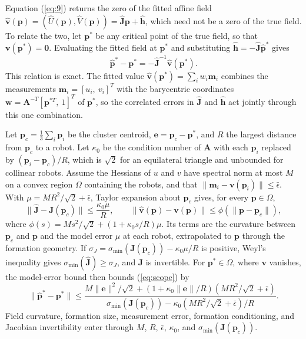 \documentclass[lettersize,journal]{IEEEtran}
\begin{document}
Equation (\ref{eq:9}) returns the zero of the fitted affine field $\hat{\mathbf{v}}(\mathbf{p}) = (\hat{U}(\mathbf{p}), \hat{V}(\mathbf{p})) = \hat{\mathbf{J}}\mathbf{p} + \hat{\mathbf{h}}$, which need not be a zero of the true field. To relate the two, let $\mathbf{p}^*$ be any critical point of the true field, so that $\mathbf{v}(\mathbf{p}^*) = \mathbf{0}$. Evaluating the fitted field at $\mathbf{p}^*$ and substituting $\hat{\mathbf{h}} = -\hat{\mathbf{J}}\hat{\mathbf{p}}^*$ gives
\begin{equation}\label{eq:scope}
\hat{\mathbf{p}}^* - \mathbf{p}^* = -\hat{\mathbf{J}}^{-1}\hat{\mathbf{v}}(\mathbf{p}^*).
\end{equation}
This relation is exact. The fitted value $\hat{\mathbf{v}}(\mathbf{p}^*) = \sum_i w_i\mathbf{m}_i$ combines the measurements $\mathbf{m}_i = [u_i,\ v_i]^T$ with the barycentric coordinates $\mathbf{w} = \mathbf{A}^{-T}[\mathbf{p}^{*T},\ 1]^T$ of $\mathbf{p}^*$, so the correlated errors in $\hat{\mathbf{J}}$ and $\hat{\mathbf{h}}$ act jointly through this one combination.

Let $\mathbf{p}_c = \frac{1}{3}\sum_i\mathbf{p}_i$ be the cluster centroid, $\mathbf{e} = \mathbf{p}_c - \mathbf{p}^*$, and $R$ the largest distance from $\mathbf{p}_c$ to a robot. Let $\kappa_0$ be the condition number of $\mathbf{A}$ with each $\mathbf{p}_i$ replaced by $(\mathbf{p}_i - \mathbf{p}_c)/R$, which is $\sqrt{2}$ for an equilateral triangle and unbounded for collinear robots. Assume the Hessians of $u$ and $v$ have spectral norm at most $M$ on a convex region $\Omega$ containing the robots, and that $\|\mathbf{m}_i - \mathbf{v}(\mathbf{p}_i)\| \le \bar{\epsilon}$. With $\mu = MR^2/\sqrt{2} + \bar{\epsilon}$, Taylor expansion about $\mathbf{p}_c$ gives, for every $\mathbf{p} \in \Omega$,
\begin{equation}\label{eq:model_err}
\|\hat{\mathbf{J}} - \mathbf{J}(\mathbf{p}_c)\| \le \frac{\kappa_0\mu}{R}, \qquad \|\hat{\mathbf{v}}(\mathbf{p}) - \mathbf{v}(\mathbf{p})\| \le \phi(\|\mathbf{p} - \mathbf{p}_c\|),
\end{equation}
where $\phi(s) = Ms^2/\sqrt{2} + (1 + \kappa_0 s/R)\mu$. Its terms are the curvature between $\mathbf{p}_c$ and $\mathbf{p}$ and the model error $\mu$ at each robot, extrapolated to $\mathbf{p}$ through the formation geometry. If $\sigma_J = \sigma_{\min}(\mathbf{J}(\mathbf{p}_c)) - \kappa_0\mu/R$ is positive, Weyl's inequality gives $\sigma_{\min}(\hat{\mathbf{J}}) \ge \sigma_J$, and $\hat{\mathbf{J}}$ is invertible. For $\mathbf{p}^* \in \Omega$, where $\mathbf{v}$ vanishes, the model-error bound then bounds (\ref{eq:scope}) by
\begin{equation}\label{eq:err_bound}
\|\hat{\mathbf{p}}^* - \mathbf{p}^*\| \le \frac{M\|\mathbf{e}\|^2/\sqrt{2} + (1 + \kappa_0\|\mathbf{e}\|/R)(MR^2/\sqrt{2} + \bar{\epsilon})}{\sigma_{\min}(\mathbf{J}(\mathbf{p}_c)) - \kappa_0(MR^2/\sqrt{2} + \bar{\epsilon})/R}.
\end{equation}
Field curvature, formation size, measurement error, formation conditioning, and Jacobian invertibility enter through $M$, $R$, $\bar{\epsilon}$, $\kappa_0$, and $\sigma_{\min}(\mathbf{J}(\mathbf{p}_c))$.
\end{document}
